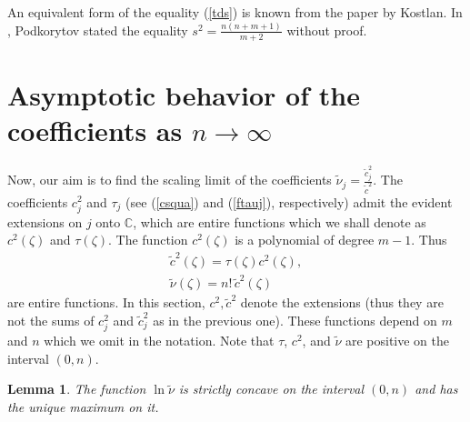 \documentclass[10pt]{amsart}
\newtheorem{lemma}{Lemma}
\theoremstyle{remark}
\let\td=\tilde
\begin{document}
An equivalent form of the equality (\ref{tds}) is known from the
paper \cite{Ko93} by Kostlan. In \cite{Po99}, Podkorytov stated
the equality $s^2=\frac{n(n+m+1)}{m+2}$ without proof.

\section{Asymptotic behavior of the coefficients as $n\to\infty$}
Now, our aim is to find the scaling limit of the coefficients
$\td\nu_j=\frac{\td c^2_j}{\td c^2}$. The coefficients  $c_j^2$
and $\tau_j$ (see (\ref{csqua}) and (\ref{ftauj}), respectively)
admit the evident extensions on $j$ onto ${\mathbb{C}}$, which are entire
functions which we shall denote as $c^2({{\mathord{\zeta}}})$ and $\tau({{\mathord{\zeta}}})$.
The function $c^2({{\mathord{\zeta}}})$ is a polynomial of degree $m-1$.
Thus
\begin{eqnarray*}
\td c^2({{\mathord{\zeta}}})=\tau({{\mathord{\zeta}}}) c^2({{\mathord{\zeta}}}),\\
\td\nu({{\mathord{\zeta}}})=n!\,\td c^2({{\mathord{\zeta}}})\phantom{,}
\end{eqnarray*}
are entire functions. In this section, $c^2,\td c^2$ denote the
extensions (thus they are not the sums of $c_j^2$ and $\td c_j^2$
as in the previous one). These functions depend on $m$ and $n$
which we omit in the notation.
Note that $\tau$, $c^2$, and $\td\nu$ are positive on the interval
$(0,n)$.
\begin{lemma}\label{tdcconc}
The function $\ln \td\nu$ is strictly concave on the interval
$(0,n)$ and has the unique maximum on it.
\end{lemma}
\end{document}
